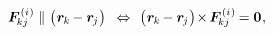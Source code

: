 \nopagebreak\vspace{-0.3em}
\begin{equation}\label{iternalinteractionsarecentral.betweenparticles}
\bm{F}^{\smthinternal}_{\hspace{-0.16ex}kj} \hspace{.15ex} \parallel \hspace{.1ex} \bigl( \hspace{.1ex} \locationvector_{\hspace{-0.1ex}k} \hspace{-0.15ex} - \locationvector_{\hspace{-0.16ex}j} \hspace{.1ex} \bigr)
\hspace{.5em} \Leftrightarrow \hspace{.4em}
\bigl( \hspace{.1ex} \locationvector_{\hspace{-0.1ex}k} \hspace{-0.15ex} - \locationvector_{\hspace{-0.16ex}j} \hspace{.1ex} \bigr) \hspace{-0.35ex} \times \hspace{-0.2ex} \bm{F}^{\smthinternal}_{\hspace{-0.16ex}kj} = \zerovector
\hspace{.1ex} ,
\end{equation}

